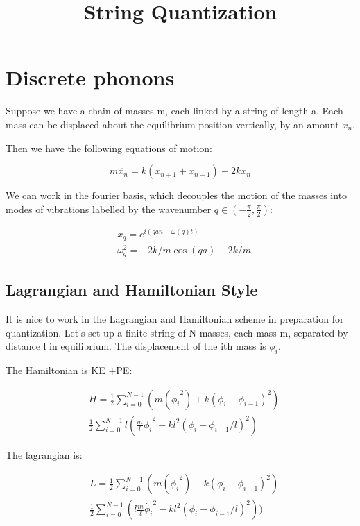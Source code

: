 
\title{String Quantization}



\maketitle 

\section{Discrete phonons}

Suppose we have a chain of masses m, each linked by a string of length a.
Each mass can be displaced about the equilibrium position vertically, by an amount
\(x_n\).

Then we have the following equations of motion:

\[m \ddot{x_n} = k \left(x_{n+1} + x_{n-1}\right) - 2 k x_n\]

We can work in the fourier basis, which decouples the motion of the masses into modes of vibrations labelled
by the wavenumber \(q \in (-\frac{\pi}{2}, \frac{\pi}{2})\):


\begin{align}
    & x_q = e^{i(qan-\omega(q) t)}\\
    & \omega_q^2 = -2k/m \cos(qa)- 2k/m
\end{align}

\subsection{Lagrangian and Hamiltonian Style}

It is nice to work in the Lagrangian and Hamiltonian scheme in preparation for quantization.
Let's set up a finite string of N masses, each mass m, separated by distance l in equilibrium. 
The displacement of the ith mass is \(\phi_i\).

The Hamiltonian is KE +PE:

\begin{align}
    & H = \frac12 \sum_{i = 0}^{N-1} ( m(\dot{\phi_i}^2) + k (\phi_i- \phi_{i-1})^2) \\
    & \frac12 \sum_{i = 0}^{N-1} l \left( \frac{m}{l} \dot{\phi_i}^2 + k l^2 (\phi_i - \phi_{i-1}/l)^2 \right)
\end{align}

The lagrangian is:

\begin{align}
    & L = \frac12 \sum_{i = 0}^{N-1} ( m(\dot{\phi_i}^2) - k (\phi_i- \phi_{i-1})^2) \\
    & \frac12 \sum_{i = 0}^{N-1} \left(l \frac{m}{l} \dot{\phi_i}^2 - k l^2 (\phi_i - \phi_{i-1}/l)^2 \right))
\end{align}


